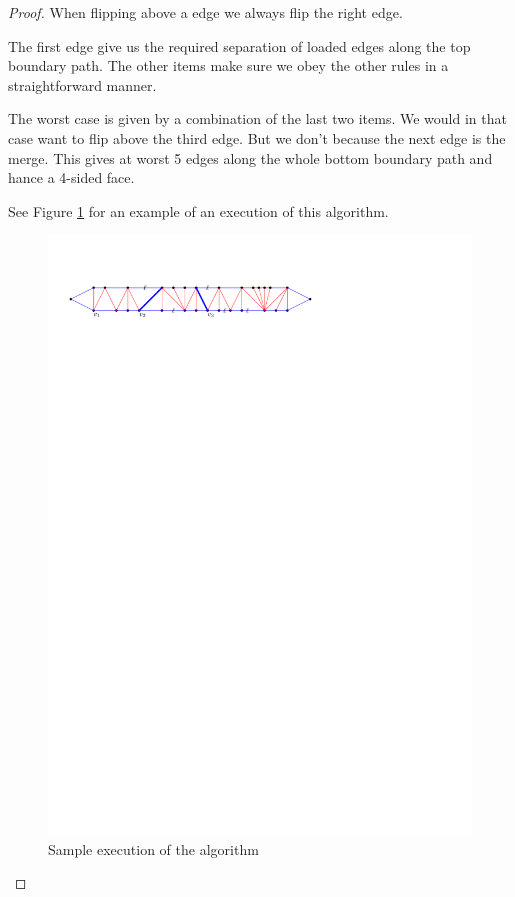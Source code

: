 \begin{proof}
  When flipping above a edge we always flip the right edge.

The first edge give us the required separation of loaded edges along the top boundary path. The other items make sure we obey the other rules in a straightforward manner.

The worst case is given by a combination of the last two items. We would in that case want to flip above the third edge. But we don't because the next edge is the merge. This gives at worst 5 edges along the whole bottom boundary path and hance a 4-sided face.



See Figure \ref{fig:subdiv:sampleExecution} for an example of an execution of this algorithm.

\begin{figure}[h]
  \centering
  \includegraphics[scale=1]{blueFaceSubdivision/img/sampleExecution}
  \caption{Sample execution of the algorithm}
  \label{fig:subdiv:sampleExecution}
\end{figure}

\end{proof}


